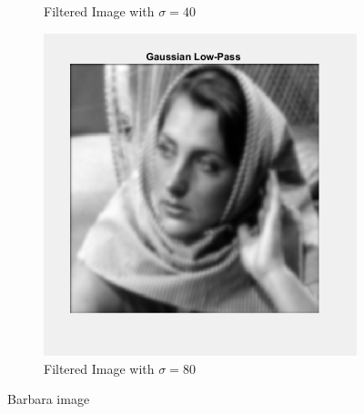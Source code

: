 \documentclass[a4paper]{article}
\begin{document}
\begin{figure}[h]
\begin{subfigure}{0.32\linewidth}
        \caption{Filtered Image with $ \sigma=40$}
    \end{subfigure}
    \begin{subfigure}{0.32\linewidth}
        \centering
        \includegraphics[width=\linewidth]{80_image.png}
        \caption{Filtered Image with $ \sigma=80$}
    \end{subfigure}
    \caption{Barbara image}
    \label{fig:bo}
\end{figure}
\end{document}
